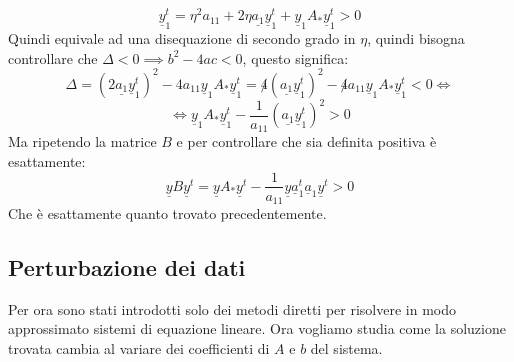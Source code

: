 \begin{itemize}
\begin{equation*}
              \underline{y}_1^t = \eta^2 a_{11}+2\eta\underline{a_1}\underline{y}_1^t +
              \underline{y}_1 A_\ast \underline{y}_1^t>0
          \end{equation*}
          Quindi equivale ad una disequazione di secondo grado in $\eta$, quindi
          bisogna controllare che $\Delta < 0\implies b^2-4ac<0$, questo significa:
          \begin{equation*}
              \Delta =(2\underline{a_1}\underline{y}_1^t)^2 -4a_{11}
              \underline{y}_1 A_\ast \underline{y}_1^t = \not 4(\underline{a_1}
              \underline{y}_1^t)^2 -\not 4 a_{11} \underline{y}_1 A_\ast \underline{y}_1^t
              < 0\iff
          \end{equation*}
          \begin{equation*}
              \iff \underline{y}_1 A_\ast \underline{y}_1^t - \frac{1}{a_{11}}
              (\underline{a_1}\underline{y}_1^t)^2>0
          \end{equation*}
          Ma ripetendo la matrice $B$ e per controllare che sia definita positiva
          è esattamente:
          \begin{equation*}
              \underline{y}B\underline{y}^t=\underline{y}A_\ast\underline{y}^t -
              \frac{1}{a_{11}} \underline{y}\underline{a}_1^t \underline{a}_1\underline{y}^t >0
          \end{equation*}
          Che è esattamente quanto trovato precedentemente.
\end{itemize}

\subsection{Perturbazione dei dati}
Per ora sono stati introdotti solo dei metodi diretti per risolvere in modo approssimato 
sistemi di equazione lineare. Ora vogliamo studia come la soluzione trovata cambia
al variare dei coefficienti di $A$ e $b$ del sistema.

